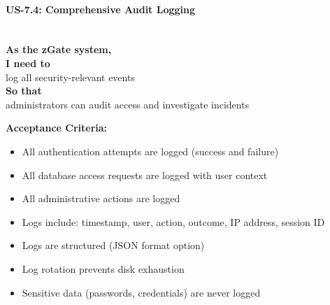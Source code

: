 \paragraph{US-7.4: Comprehensive Audit Logging}
\mbox{}\\[0.5em]

\noindent\textbf{As the zGate system,} \\
\textbf{I need to} \\
log all security-relevant events \\
\textbf{So that} \\
administrators can audit access and investigate incidents

\noindent\textbf{Acceptance Criteria:}
\begin{itemize}
    \item All authentication attempts are logged (success and failure)
    \item All database access requests are logged with user context
    \item All administrative actions are logged
    \item Logs include: timestamp, user, action, outcome, IP address, session ID
    \item Logs are structured (JSON format option)
    \item Log rotation prevents disk exhaustion
    \item Sensitive data (passwords, credentials) are never logged
\end{itemize}
